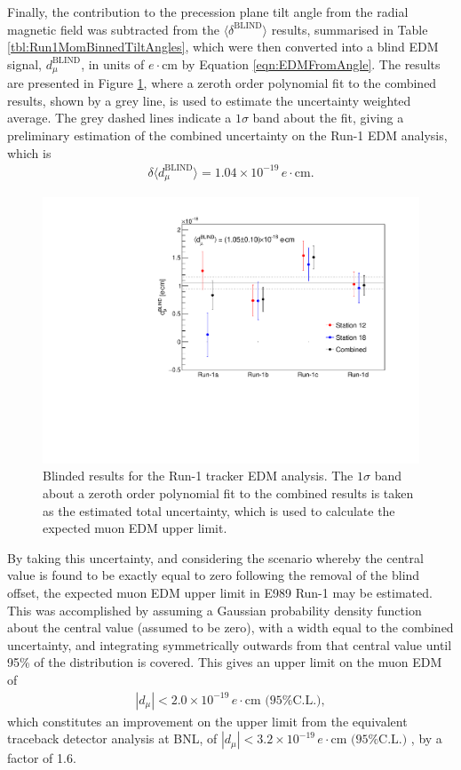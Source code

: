 Finally, the contribution to the precession plane tilt angle from the radial magnetic field was subtracted from the $\langle \delta^{\text{BLIND}} \rangle$ results, summarised in Table \ref{tbl:Run1MomBinnedTiltAngles}, which were then converted into a blind EDM signal, $d_{\mu}^{\text{BLIND}}$, in units of $e\cdot$cm by Equation \ref{eqn:EDMFromAngle}. The results are presented in Figure \ref{fig:MainResult}, where a zeroth order polynomial fit to the combined results, shown by a grey line, is used to estimate the uncertainty weighted average. The grey dashed lines indicate a $1\sigma$ band about the fit, giving a preliminary estimation of the combined uncertainty on the Run-1 EDM analysis, which is     
%
\begin{align*}
  \delta \langle d_{\mu}^{\text{BLIND}} \rangle = 1.04\times10^{-19} \,e\cdot\text{cm}.
\end{align*}
%
\begin{figure}[b!]
\centering{}
\includegraphics[trim={0 0 0 0},clip,width=.89\textwidth]{Images/Chapter6/EDM_vs_DS_blinded_1000_2500MeV_250MeV_randomised_BQ.pdf}
\caption{Blinded results for the Run-1 tracker EDM analysis. The $1\sigma$ band about a zeroth order polynomial fit to the combined results is taken as the estimated total uncertainty, which is used to calculate the expected muon EDM upper limit.}
\label{fig:MainResult}
\end{figure} 
%
By taking this uncertainty, and considering the scenario whereby the central value is found to be exactly equal to zero following the removal of the blind offset, the expected muon EDM upper limit in E989 Run-1 may be estimated. This was accomplished by assuming a Gaussian probability density function about the central value (assumed to be zero), with a width equal to the combined uncertainty, and integrating symmetrically outwards from that central value until 95\% of the distribution is covered. This gives an upper limit on the muon EDM of
%
\begin{align*}
    | d_{\mu} | <  2.0\times10^{-19} \,e\cdot\text{cm (95\% C.L.)},
\end{align*}
% 
which constitutes an improvement on the upper limit from the equivalent traceback detector analysis at BNL, of $| d_{\mu} | <  3.2\times10^{-19} \,e\cdot\text{cm (95\% C.L.)}$ \cite{BNLEDM}, by a factor of 1.6. 

